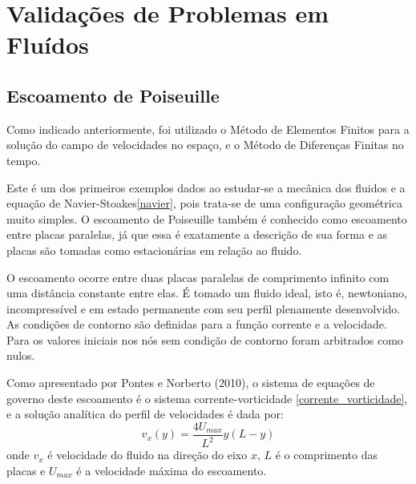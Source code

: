 \section{\textbf{Validações de Problemas em Fluídos}}
\label{sec_fluidos}
\subsection{\textbf{Escoamento de Poiseuille}}
\label{sec_poiseuille}
Como indicado anteriormente, foi utilizado o Método de Elementos Finitos para a solução do campo de velocidades no espaço, e o Método de Diferenças Finitas no tempo.

Este é um dos primeiros exemplos dados ao estudar-se a mecânica dos fluidos e a equação de Navier-Stoakes\eqref{navier}, pois trata-se de uma configuração geométrica muito simples.
O escoamento de Poiseuille também é conhecido como escoamento entre placas paralelas, já que essa é exatamente a descrição de sua forma e as placas são tomadas como estacionárias em relação ao fluido.

O escoamento ocorre entre duas placas paralelas de comprimento infinito com uma distância constante entre elas.
É tomado um fluido ideal, isto é, newtoniano, incompressível e em estado permanente com seu perfil plenamente desenvolvido.
As condições de contorno são definidas para a função corrente e a velocidade.
Para os valores iniciais nos nós sem condição de contorno foram arbitrados como nulos.

Como apresentado por Pontes e Norberto (2010)\cite{pontes_norberto}, o sistema de equações de governo deste escoamento é o sistema corrente-vorticidade \ref{corrente_vorticidade}, e a solução analítica do perfil de velocidades é dada por:
\begin{equation}
    v_x(y) = \dfrac{4U_{max}}{L^2}y(L-y)
    \label{poiseuille_sol} 
\end{equation}
onde $v_x$ é velocidade do fluido na direção do eixo $x$, $L$ é o comprimento das placas e $U_{max}$ é a velocidade máxima do escoamento.

